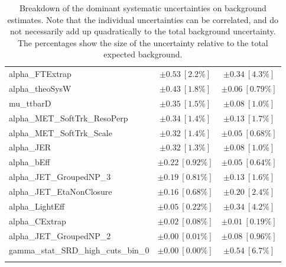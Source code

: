 \begin{table}
\begin{center}
\begin{tabular*}{\textwidth}{@{\extracolsep{\fill}}lcc}
alpha\_FTExtrap         & $\pm 0.53\ [2.2\%] $          & $\pm 0.34\ [4.3\%] $       \\
alpha\_theoSysW         & $\pm 0.43\ [1.8\%] $          & $\pm 0.06\ [0.79\%] $       \\
mu\_ttbarD         & $\pm 0.35\ [1.5\%] $          & $\pm 0.08\ [1.0\%] $       \\
alpha\_MET\_SoftTrk\_ResoPerp         & $\pm 0.34\ [1.4\%] $          & $\pm 0.13\ [1.7\%] $       \\
alpha\_MET\_SoftTrk\_Scale         & $\pm 0.32\ [1.4\%] $          & $\pm 0.05\ [0.68\%] $       \\
alpha\_JER         & $\pm 0.32\ [1.3\%] $          & $\pm 0.08\ [1.0\%] $       \\
alpha\_bEff         & $\pm 0.22\ [0.92\%] $          & $\pm 0.05\ [0.64\%] $       \\
alpha\_JET\_GroupedNP\_3         & $\pm 0.19\ [0.81\%] $          & $\pm 0.13\ [1.6\%] $       \\
alpha\_JET\_EtaNonClosure         & $\pm 0.16\ [0.68\%] $          & $\pm 0.20\ [2.4\%] $       \\
alpha\_LightEff         & $\pm 0.05\ [0.22\%] $          & $\pm 0.34\ [4.2\%] $       \\
alpha\_CExtrap         & $\pm 0.02\ [0.08\%] $          & $\pm 0.01\ [0.19\%] $       \\
alpha\_JET\_GroupedNP\_2         & $\pm 0.00\ [0.01\%] $          & $\pm 0.08\ [0.96\%] $       \\
gamma\_stat\_SRD\_high\_cuts\_bin\_0         & $\pm 0.00\ [0.00\%] $          & $\pm 0.54\ [6.7\%] $       \\
\noalign{\smallskip}\hline\noalign{\smallskip}
\end{tabular*}
\end{center}
\caption[Breakdown of uncertainty on background estimates]{
Breakdown of the dominant systematic uncertainties on background estimates.
Note that the individual uncertainties can be correlated, and do not necessarily add up quadratically to 
the total background uncertainty. The percentages show the size of the uncertainty relative to the total expected background.
\label{table.results.bkgestimate.uncertainties.SRD_low_SRD_high}}
\end{table}
%